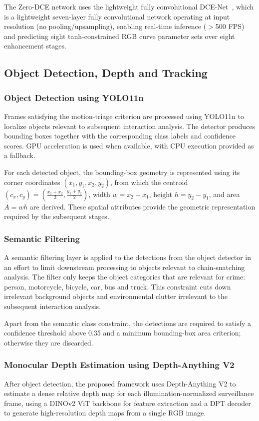 \documentclass[runningheads]{llncs}
\begin{document}
The Zero-DCE network uses the lightweight fully convolutional DCE-Net~\cite{zerodce}, which is a lightweight seven-layer fully convolutional
network operating at input resolution (no pooling/upsampling), enabling
real-time inference ($>$500 FPS) and predicting eight tanh-constrained
RGB curve parameter sets over eight enhancement stages.

\subsection{Object Detection, Depth and Tracking}

\subsubsection{Object Detection using YOLO11n}
Frames satisfying the motion-triage criterion are processed using
YOLO11n \cite{yolov11} to localize objects relevant to subsequent
interaction analysis. The detector produces bounding boxes together
with the corresponding class labels and confidence scores. GPU
acceleration is used when available, with CPU execution provided as a
fallback.

For each detected object, the bounding-box geometry is represented
using its corner coordinates $(x_1,y_1,x_2,y_2)$, from which the
centroid $(c_x,c_y)=\left(\frac{x_1+x_2}{2},\frac{y_1+y_2}{2}\right)$,
width $w=x_2-x_1$, height $h=y_2-y_1$, and area $A=wh$ are derived.
These spatial attributes provide the geometric representation required
by the subsequent stages.

\subsubsection{Semantic Filtering}

A semantic filtering layer is applied to the detections from the object detector in an effort to limit downstream processing to objects relevant to chain-snatching analysis. The filter only keeps the object categories that are relevant for crime: person, motorcycle, bicycle, car, bus and truck. This constraint cuts down irrelevant background objects and environmental clutter irrelevant to the subsequent interaction analysis.

Apart from the semantic class constraint, the detections are required to satisfy a confidence threshold above 0.35 and a minimum bounding-box area criterion; otherwise they are discarded.

\subsubsection{Monocular Depth Estimation using Depth-Anything V2}
After object detection, the proposed framework uses Depth-Anything V2
\cite{yang2024depth} to estimate a dense relative depth map for each
illumination-normalized surveillance frame, using a DINOv2 ViT backbone
for feature extraction and a DPT decoder to generate high-resolution
depth maps from a single RGB image.
\end{document}
